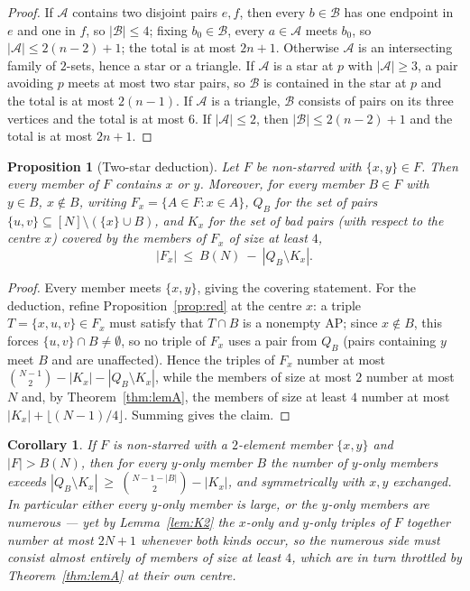 \documentclass[11pt]{article}
\newtheorem{proposition}[theorem]{Proposition}
\newtheorem{corollary}[theorem]{Corollary}
\theoremstyle{definition}
\begin{document}
\begin{proof}
If $\mathcal{A}$ contains two disjoint pairs $e,f$, then every $b\in\mathcal{B}$ has one endpoint in $e$ and one in $f$, so $|\mathcal{B}|\le 4$; fixing $b_0\in\mathcal{B}$, every $a\in\mathcal{A}$ meets $b_0$, so $|\mathcal{A}|\le 2(n-2)+1$; the total is at most $2n+1$. Otherwise $\mathcal{A}$ is an intersecting family of $2$-sets, hence a star or a triangle. If $\mathcal{A}$ is a star at $p$ with $|\mathcal{A}|\ge 3$, a pair avoiding $p$ meets at most two star pairs, so $\mathcal{B}$ is contained in the star at $p$ and the total is at most $2(n-1)$. If $\mathcal{A}$ is a triangle, $\mathcal{B}$ consists of pairs on its three vertices and the total is at most $6$. If $|\mathcal{A}|\le 2$, then $|\mathcal{B}|\le 2(n-2)+1$ and the total is at most $2n+1$.
\end{proof}

\begin{proposition}[Two-star deduction]\label{prop:K3}
Let $F$ be non-starred with $\{x,y\}\in F$. Then every member of $F$ contains $x$ or $y$. Moreover, for every member $B\in F$ with $y\in B$, $x\notin B$, writing $F_x=\{A\in F: x\in A\}$, $Q_B$ for the set of pairs $\{u,v\}\subseteq[N]\setminus(\{x\}\cup B)$, and $K_x$ for the set of bad pairs (with respect to the centre $x$) covered by the members of $F_x$ of size at least $4$,
\[ |F_x|\ \le\ B(N)\ -\ |Q_B\setminus K_x|. \]
\end{proposition}

\begin{proof}
Every member meets $\{x,y\}$, giving the covering statement. For the deduction, refine Proposition~\ref{prop:red} at the centre $x$: a triple $T=\{x,u,v\}\in F_x$ must satisfy that $T\cap B$ is a nonempty AP; since $x\notin B$, this forces $\{u,v\}\cap B\neq\emptyset$, so no triple of $F_x$ uses a pair from $Q_B$ (pairs containing $y$ meet $B$ and are unaffected). Hence the triples of $F_x$ number at most $\binom{N-1}2-|K_x|-|Q_B\setminus K_x|$, while the members of size at most $2$ number at most $N$ and, by Theorem~\ref{thm:lemA}, the members of size at least $4$ number at most $|K_x|+\lfloor(N-1)/4\rfloor$. Summing gives the claim.
\end{proof}

\begin{corollary}\label{cor:K4}
If $F$ is non-starred with a $2$-element member $\{x,y\}$ and $|F|>B(N)$, then for every $y$-only member $B$ the number of $y$-only members exceeds $|Q_B\setminus K_x|\ \ge\ \binom{N-1-|B|}{2}-|K_x|$, and symmetrically with $x,y$ exchanged. In particular either every $y$-only member is large, or the $y$-only members are numerous --- yet by Lemma~\ref{lem:K2} the $x$-only and $y$-only triples of $F$ together number at most $2N+1$ whenever both kinds occur, so the numerous side must consist almost entirely of members of size at least $4$, which are in turn throttled by Theorem~\ref{thm:lemA} at their own centre.
\end{corollary}
\end{document}
